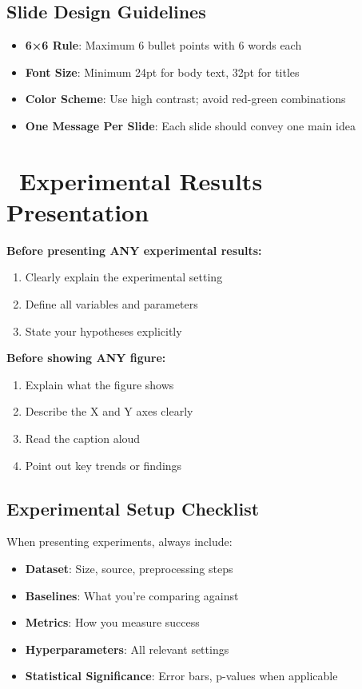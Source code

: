 \documentclass[11pt,a4paper]{article}
\begin{document}
\subsection{Slide Design Guidelines}
\begin{itemize}
    \item \textbf{6×6 Rule}: Maximum 6 bullet points with 6 words each
    \item \textbf{Font Size}: Minimum 24pt for body text, 32pt for titles
    \item \textbf{Color Scheme}: Use high contrast; avoid red-green combinations
    \item \textbf{One Message Per Slide}: Each slide should convey one main idea
\end{itemize}

\section{\faChartLine~Experimental Results Presentation}

\begin{tcolorbox}[colback=yellow!10,colframe=red!50,title={\faExclamationTriangle~Critical Requirements}]
\textbf{Before presenting ANY experimental results:}
\begin{enumerate}
    \item Clearly explain the experimental setting
    \item Define all variables and parameters
    \item State your hypotheses explicitly
\end{enumerate}

\textbf{Before showing ANY figure:}
\begin{enumerate}
    \item Explain what the figure shows
    \item Describe the X and Y axes clearly
    \item Read the caption aloud
    \item Point out key trends or findings
\end{enumerate}
\end{tcolorbox}

\subsection{Experimental Setup Checklist}
When presenting experiments, always include:
\begin{itemize}
    \item \textbf{Dataset}: Size, source, preprocessing steps
    \item \textbf{Baselines}: What you're comparing against
    \item \textbf{Metrics}: How you measure success
    \item \textbf{Hyperparameters}: All relevant settings
    \item \textbf{Statistical Significance}: Error bars, p-values when applicable
\end{itemize}
\end{document}
